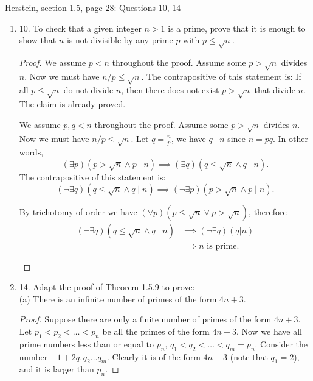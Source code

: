 Herstein, section 1.5, page 28: Questions 10, 14
\begin{enumerate}[resume]
	\item  10. To check that a given integer $n>1$ is a prime, prove that it is enough to show that $n$ is not divisible by any prime $p$ with $p \leq \sqrt{n}$.
\begin{proof}
	We assume $p<n$ throughout the proof. Assume some $p>\sqrt{n } $ divides $n$. Now we must have $n / p \le  \sqrt{n} $.
	The contrapositive of this statement is: If all $p\le \sqrt{n} $ do not divide $n$, then there does not exist $p>\sqrt{n} $ that divide $n$. The claim is already proved.

\begin{correction}
	We assume $p,q<n$ throughout the proof. Assume some $p>\sqrt{n } $ divides $n$. Now we must have $n / p \le  \sqrt{n} $. Let $q = \frac{n}{p}$, we have $q \mid n$ since $n = pq$. In other words,
	\[
		(\exists  p) \left(p> \sqrt{n} \land  p\mid n \right) \implies (\exists q)\left( q\le \sqrt{n} \land q\mid n\right)
	.\] 
	The contrapositive of this statement is: 
\[
	(\lnot \exists  q) \left( q\le \sqrt{n}  \land  q \mid n\right) \implies  (\lnot \exists  p )\left( p > \sqrt{n} \land  p\mid n \right) 
.\] 

By trichotomy of order we have $(\forall p)(p\le \sqrt{n} \lor p>\sqrt{n} )$, therefore
\begin{align*}
	(\lnot \exists  q) \left( q\le \sqrt{n}  \land  q \mid n\right) &\implies (\lnot \exists q)(q | n)\\
									&\implies n \text{ is prime}
.\end{align*} 

\end{correction}
\end{proof}
	\item 14. Adapt the proof of Theorem 1.5.9 to prove:\\
		(a) There is an infinite number of primes of the form $4 n+3$.
\begin{proof}
	Suppose there are only a finite number of primes of the form $4n+3$.
	Let  $p_1 < p_2 < \ldots < p_n$ be all the primes of the form $4n+3$. Now we have all prime numbers less than or equal to $p_n$, $q_1 < q_2 < \ldots < q_m = p_n$. Consider the number $-1 + 2 q_1 q_2 \ldots q_m$. Clearly it is of the form $4n+3$ (note that $q_1 = 2$), and it is larger than $p_n$.


\end{proof}
\end{enumerate}
